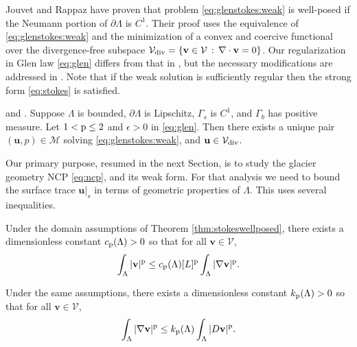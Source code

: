 \documentclass[hidelinks,onefignum,onetabnum,final]{siamart220329}  %
\newcommand{\eps}{\epsilon}
\newcommand{\grad}{\nabla}
\newcommand{\Div}{\nabla\cdot}
\newcommand{\bu}{\mathbf{u}}
\newcommand{\bv}{\mathbf{v}}
\newcommand{\cV}{\mathcal{V}}
\newcommand{\pp}{{\text{\textnormal{p}}}}
\newcommand{\Vdiv}{\cV_{\text{\textnormal{div}}}}
\begin{document}
Jouvet and Rappaz \cite{JouvetRappaz2011} have proven that problem \eqref{eq:glenstokes:weak} is well-posed if the Neumann portion of $\partial\Lambda$ is $C^1$.  Their proof uses the equivalence of \eqref{eq:glenstokes:weak} and the minimization of a convex and coercive functional over the divergence-free subspace $\Vdiv = \{\bv\in\cV\,:\,\Div\bv=0\}$.  Our regularization in Glen law \eqref{eq:glen} differs from that in \cite{JouvetRappaz2011}, but the necessary modifications are addressed in \cite{IsaacStadlerGhattas2015}.  Note that if the weak solution is sufficiently regular then the strong form \eqref{eq:stokes} is satisfied.

\begin{theorem} \label{thm:stokeswellposed} \cite[Theorem 3.10]{JouvetRappaz2011} and \cite[Appendix A]{IsaacStadlerGhattas2015}.  Suppose $\Lambda$ is bounded, $\partial\Lambda$ is Lipschitz, $\Gamma_s$ is $C^1$, and $\Gamma_b$ has positive measure.  Let $1<\pp\le 2$ and $\eps>0$ in \eqref{eq:glen}.  Then there exists a unique pair $(\bu,p) \in \mathcal{M}$ solving \eqref{eq:glenstokes:weak}, and $\bu\in \Vdiv$.
\end{theorem}

Our primary purpose, resumed in the next Section, is to study the glacier geometry NCP \eqref{eq:ncp}, and its weak form.  For that analysis we need to bound the surface trace $\bu|_s$ in terms of geometric properties of $\Lambda$.  This uses several inequalities.

\begin{lemma} \label{lem:poincare}
Under the domain assumptions of Theorem \ref{thm:stokeswellposed}, there exists a dimensionless constant $c_{\pp}(\Lambda)>0$ so that for all $\bv \in \cV$,
\begin{equation}
\int_\Lambda |\bv|^\pp \le c_{\pp}(\Lambda) [L]^\pp \int_\Lambda |\grad\bv|^\pp. \label{eq:poincare}
\end{equation}
\end{lemma}

\begin{lemma} \label{lem:korns}
Under the same assumptions, there exists a dimensionless constant $k_{\pp}(\Lambda)>0$ so that for all $\bv \in \cV$,
\begin{equation}
\int_\Lambda |\grad\bv|^\pp \le k_{\pp}(\Lambda) \int_\Lambda |D\bv|^\pp. \label{eq:korns}
\end{equation}
\end{lemma}
\end{document}
